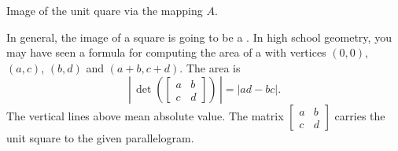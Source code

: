 \begin{myfig}
\capstart
{}
\caption{Image of the unit quare via the mapping
$A$.\label{linalg-imagesquare:fig}}
\end{myfig}

In general, the image of a square is going to be a .
In high school geometry, you may have seen a formula for
computing the area of a 
with vertices $(0,0)$, $(a,c)$, $(b,d)$
and $(a+b,c+d)$.  The area is
\begin{equation*}
\left\lvert \, \det \left(
\begin{bmatrix} a & b \\ c & d \end{bmatrix}
\right) \, \right\lvert
=
\lvert
a d - b c
\rvert
.
\end{equation*}
The vertical lines above mean absolute value.
The matrix $\left[ \begin{smallmatrix} a & b \\ c & d \end{smallmatrix}
\right]$
carries the unit square to the given parallelogram.

\medskip

